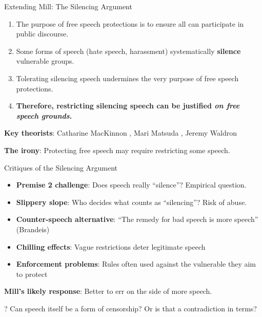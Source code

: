 ﻿\documentclass[aspectratio=169]{beamer}
\begin{document}
\begin{frame}{Extending Mill: The Silencing Argument}
\begin{argumentbox}
\begin{enumerate}
    \item The purpose of free speech protections is to ensure all can participate in public discourse.
    \item Some forms of speech (hate speech, harassment) systematically \textbf{silence} vulnerable groups.
    \item Tolerating silencing speech undermines the very purpose of free speech protections.
    \item[\textbf{C.}] \textbf{Therefore, restricting silencing speech can be justified \textit{on free speech grounds}.}
\end{enumerate}
\end{argumentbox}

\vspace{0.3cm}
\textbf{Key theorists}: Catharine MacKinnon \parencite{mackinnon1993only}, Mari Matsuda \parencite{matsuda_words_wound}, Jeremy Waldron \parencite{waldron2012harm}

\vspace{0.2cm}
\textbf{The irony}: Protecting free speech may require restricting some speech.
\end{frame}

\begin{frame}{Critiques of the Silencing Argument}
\begin{itemize}
    \item \textbf{Premise 2 challenge}: Does speech really ``silence''? Empirical question.
    
    \item \textbf{Slippery slope}: Who decides what counts as ``silencing''? Risk of abuse.
    
    \item \textbf{Counter-speech alternative}: ``The remedy for bad speech is more speech'' (Brandeis)
    
    \item \textbf{Chilling effects}: Vague restrictions deter legitimate speech
    
    \item \textbf{Enforcement problems}: Rules often used against the vulnerable they aim to protect
\end{itemize}

\vspace{0.3cm}
\textbf{Mill's likely response}: Better to err on the side of more speech.

\begin{alertblock}{?}
Can speech itself be a form of censorship? Or is that a contradiction in terms?
\end{alertblock}
\end{frame}
\end{document}
